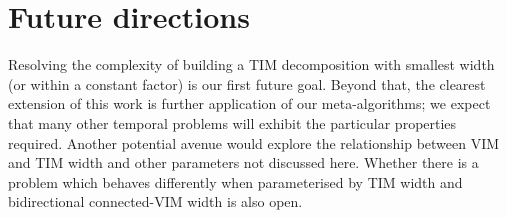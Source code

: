 \documentclass[a4paper,UKenglish,cleveref, autoref, thm-restate]{lipics-v2021} %
\begin{document}
\begin{toappendix}
\end{toappendix}
\section{Future directions}\label{sec:conclusion}

Resolving the complexity of building a TIM decomposition with smallest width (or within a constant factor) is our first future goal.  
Beyond that, the clearest extension of this work is further application of our meta-algorithms; we expect that many other temporal problems will exhibit the particular properties required. Another potential avenue would explore the relationship between VIM and TIM width and other parameters not discussed here.
Whether there is a problem which behaves differently when parameterised by TIM width and bidirectional connected-VIM width is also open.
\end{document}
